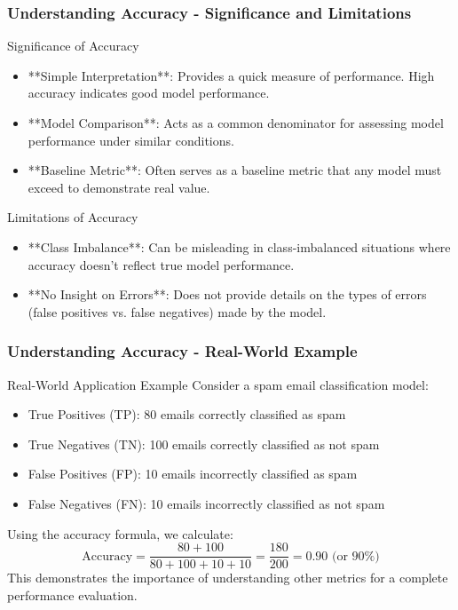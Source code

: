 \documentclass[aspectratio=169]{beamer}
\begin{document}
\begin{frame}[fragile]
    \frametitle{Understanding Accuracy - Significance and Limitations}
    \begin{block}{Significance of Accuracy}
        \begin{itemize}
            \item **Simple Interpretation**: Provides a quick measure of performance. High accuracy indicates good model performance.
            \item **Model Comparison**: Acts as a common denominator for assessing model performance under similar conditions.
            \item **Baseline Metric**: Often serves as a baseline metric that any model must exceed to demonstrate real value.
        \end{itemize}
    \end{block}
    
    \begin{block}{Limitations of Accuracy}
        \begin{itemize}
            \item **Class Imbalance**: Can be misleading in class-imbalanced situations where accuracy doesn't reflect true model performance.
            \item **No Insight on Errors**: Does not provide details on the types of errors (false positives vs. false negatives) made by the model.
        \end{itemize}
    \end{block}
\end{frame}

\begin{frame}[fragile]
    \frametitle{Understanding Accuracy - Real-World Example}
    \begin{block}{Real-World Application Example}
        Consider a spam email classification model:
        \begin{itemize}
            \item True Positives (TP): 80 emails correctly classified as spam
            \item True Negatives (TN): 100 emails correctly classified as not spam
            \item False Positives (FP): 10 emails incorrectly classified as spam
            \item False Negatives (FN): 10 emails incorrectly classified as not spam
        \end{itemize}
        Using the accuracy formula, we calculate:
        \begin{equation}
            \text{Accuracy} = \frac{80 + 100}{80 + 100 + 10 + 10} = \frac{180}{200} = 0.90 \text{ (or } 90\%\text{)}
        \end{equation}
        This demonstrates the importance of understanding other metrics for a complete performance evaluation.
    \end{block}
\end{frame}
\end{document}
